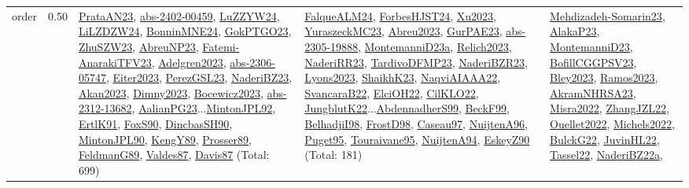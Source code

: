 {\begin{longtable}{p{3cm}r>{\raggedright\arraybackslash}p{6cm}>{\raggedright\arraybackslash}p{6cm}>{\raggedright\arraybackslash}p{8cm}}
\index{order}\index{Scheduling!order}order &  0.50 & \hyperref[detail:PrataAN23]{PrataAN23}, \hyperref[detail:abs-2402-00459]{abs-2402-00459}, \hyperref[detail:LuZZYW24]{LuZZYW24}, \hyperref[detail:LiLZDZW24]{LiLZDZW24}, \hyperref[detail:BonninMNE24]{BonninMNE24}, \hyperref[detail:GokPTGO23]{GokPTGO23}, \hyperref[detail:ZhuSZW23]{ZhuSZW23}, \hyperref[detail:AbreuNP23]{AbreuNP23}, \hyperref[detail:Fatemi-AnarakiTFV23]{Fatemi-AnarakiTFV23}, \hyperref[detail:Adelgren2023]{Adelgren2023}, \hyperref[detail:abs-2306-05747]{abs-2306-05747}, \hyperref[detail:Eiter2023]{Eiter2023}, \hyperref[detail:PerezGSL23]{PerezGSL23}, \hyperref[detail:NaderiBZ23]{NaderiBZ23}, \hyperref[detail:Akan2023]{Akan2023}, \hyperref[detail:Dimny2023]{Dimny2023}, \hyperref[detail:Bocewicz2023]{Bocewicz2023}, \hyperref[detail:abs-2312-13682]{abs-2312-13682}, \hyperref[detail:AalianPG23]{AalianPG23}...\hyperref[detail:MintonJPL92]{MintonJPL92}, \hyperref[detail:ErtlK91]{ErtlK91}, \hyperref[detail:FoxS90]{FoxS90}, \hyperref[detail:DincbasSH90]{DincbasSH90}, \hyperref[detail:MintonJPL90]{MintonJPL90}, \hyperref[detail:KengY89]{KengY89}, \hyperref[detail:Prosser89]{Prosser89}, \hyperref[detail:FeldmanG89]{FeldmanG89}, \hyperref[detail:Valdes87]{Valdes87}, \hyperref[detail:Davis87]{Davis87} (Total: 699) & \hyperref[detail:FalqueALM24]{FalqueALM24}, \hyperref[detail:ForbesHJST24]{ForbesHJST24}, \hyperref[detail:Xu2023]{Xu2023}, \hyperref[detail:YuraszeckMC23]{YuraszeckMC23}, \hyperref[detail:Abreu2023]{Abreu2023}, \hyperref[detail:GurPAE23]{GurPAE23}, \hyperref[detail:abs-2305-19888]{abs-2305-19888}, \hyperref[detail:MontemanniD23a]{MontemanniD23a}, \hyperref[detail:Relich2023]{Relich2023}, \hyperref[detail:NaderiRR23]{NaderiRR23}, \hyperref[detail:TardivoDFMP23]{TardivoDFMP23}, \hyperref[detail:NaderiBZR23]{NaderiBZR23}, \hyperref[detail:Lyons2023]{Lyons2023}, \hyperref[detail:ShaikhK23]{ShaikhK23}, \hyperref[detail:NaqviAIAAA22]{NaqviAIAAA22}, \hyperref[detail:SvancaraB22]{SvancaraB22}, \hyperref[detail:ElciOH22]{ElciOH22}, \hyperref[detail:CilKLO22]{CilKLO22}, \hyperref[detail:JungblutK22]{JungblutK22}...\hyperref[detail:AbdennadherS99]{AbdennadherS99}, \hyperref[detail:BeckF99]{BeckF99}, \hyperref[detail:BelhadjiI98]{BelhadjiI98}, \hyperref[detail:FrostD98]{FrostD98}, \hyperref[detail:Caseau97]{Caseau97}, \hyperref[detail:NuijtenA96]{NuijtenA96}, \hyperref[detail:Puget95]{Puget95}, \hyperref[detail:Touraivane95]{Touraivane95}, \hyperref[detail:NuijtenA94]{NuijtenA94}, \hyperref[detail:EskeyZ90]{EskeyZ90} (Total: 181) & \hyperref[detail:Mehdizadeh-Somarin23]{Mehdizadeh-Somarin23}, \hyperref[detail:AlakaP23]{AlakaP23}, \hyperref[detail:MontemanniD23]{MontemanniD23}, \hyperref[detail:BofillCGGPSV23]{BofillCGGPSV23}, \hyperref[detail:Bley2023]{Bley2023}, \hyperref[detail:Ramos2023]{Ramos2023}, \hyperref[detail:AkramNHRSA23]{AkramNHRSA23}, \hyperref[detail:Misra2022]{Misra2022}, \hyperref[detail:ZhangJZL22]{ZhangJZL22}, \hyperref[detail:Ouellet2022]{Ouellet2022}, \hyperref[detail:Michels2022]{Michels2022}, \hyperref[detail:BulckG22]{BulckG22}, \hyperref[detail:JuvinHL22]{JuvinHL22}, \hyperref[detail:Tassel22]{Tassel22}, \hyperref[detail:NaderiBZ22a]{NaderiBZ22a}, 
\end{longtable}}
